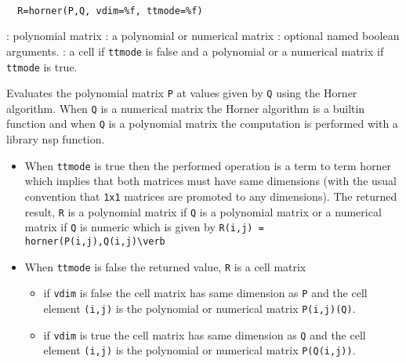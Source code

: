 \begin{mandesc}
   \\ %
\end{mandesc}
\begin{calling_sequence}
\begin{verbatim}
  R=horner(P,Q, vdim=%f, ttmode=%f)
\end{verbatim}
\end{calling_sequence}
\begin{parameters}
  \begin{varlist}
    : polynomial matrix
    : a polynomial or numerical matrix
    : optional named boolean arguments.
    : a cell if \verb!ttmode! is false and a 
    polynomial or a numerical matrix if \verb!ttmode! is true.
  \end{varlist}
\end{parameters}
\begin{mandescription}
  Evaluates the polynomial matrix \verb!P! at values given by \verb!Q! 
  using the Horner algorithm. When \verb!Q! is a 
  numerical matrix the Horner algorithm is a builtin function 
  and when \verb!Q! is a  polynomial matrix the computation is 
  performed with a library nsp function. 
  
  \begin{itemize} 
  \item When \verb!ttmode! is true then the performed operation is a term to term 
    horner which implies that both matrices must have same dimensions (with 
    the usual convention that \verb!1x1! matrices are promoted 
    to any dimensions). The returned result, \verb!R! is a polynomial matrix if 
    \verb!Q! is a polynomial matrix or a numerical matrix if \verb!Q! is numeric 
    which is given by \verb!R(i,j) = horner(P(i,j),Q(i,j)\verb!
  \item When \verb!ttmode! is false the returned value, \verb!R! is a cell matrix 
    \begin{itemize}
    \item if \verb!vdim! is false the cell matrix has same dimension 
      as \verb!P! and the cell element \verb!(i,j)! is the polynomial or 
      numerical matrix \verb!P(i,j)(Q)!. 
    \item if \verb!vdim! is true the cell matrix has same dimension 
      as \verb!Q! and the cell element \verb!(i,j)! is the polynomial
      or numerical matrix \verb!P(Q(i,j))!.
    \end{itemize}
  \end{itemize}
\end{mandescription}
